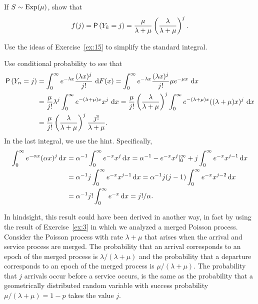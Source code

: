 \begin{exercise}[\faCalculator]
 If $S\sim \operatorname{Exp}(\mu)$, show that 
  \begin{equation} \label{eq:41}
f(j) = \P{Y_k = j} = \frac{\mu}{\lambda+\mu}\left(\frac{\lambda}{\lambda+\mu}\right)^j.
  \end{equation}
  \begin{hint}
Use the ideas of Exercise~\ref{ex:15} to simplify the standard integral.
  \end{hint}
  \begin{solution}
Use conditional probability to see that 
\begin{align*}
  \P{Y_n = j} 
&= \int_0^\infty e^{-\lambda x}\frac{(\lambda x)^j}{j!}\, \d F(x) = \int_0^\infty e^{-\lambda x}\frac{(\lambda x)^j}{j!} \mu e^{-\mu x}\, \d x \\
&= \frac{\mu}{j!}\lambda^j \int_0^\infty e^{-(\lambda+\mu) x}x^j\,\d x = \frac{\mu}{j!}\left(\frac{\lambda}{\lambda+\mu}\right)^j \int_0^\infty e^{-(\lambda+\mu) x}((\lambda+\mu)x)^j\,\d x \\
&= \frac{\mu}{j!}\left(\frac{\lambda}{\lambda+\mu}\right)^j \frac{j!}{\lambda+\mu}.
\end{align*}
In the last integral, we use the hint. Specifically, 
\begin{align*}
  \int_0^\infty e^{-\alpha x} (\alpha x)^j \,\text{d}x 
&=  \alpha^{-1} \int_0^\infty e^{- x} x^j \,\text{d}x  
=  \alpha^{-1} -e^{-x}x^j |_0^\infty + j \int_0^\infty e^{- x} x^{j-1} \,\text{d}x \\
&= \alpha^{-1} j \int_0^\infty e^{- x} x^{j-1} \,\text{d}x 
= \alpha^{-1} j(j-1) \int_0^\infty e^{- x} x^{j-2} \,\text{d}x \\
&= \alpha^{-1} j! \int_0^\infty e^{- x} \,\text{d}x 
= j!/\alpha.
\end{align*}


In hindsight, this result could have been derived in another way, in
fact by using the result of Exercise~\ref{ex:3} in which we analyzed a
merged Poisson process. Consider the Poisson process with rate
$\lambda+\mu$ that arises when the arrival and service process are
merged. The probability that an arrival corresponds to an epoch of the
merged process is $\lambda/(\lambda+\mu)$ and the probability that a
departure corresponds to an epoch of the merged process is
$\mu/(\lambda+\mu)$.  The probability that $j$ arrivals occur before a
service occurs, is the same as the probability that a geometrically
distributed random variable with success probability
$\mu/(\lambda+\mu) = 1-p$ takes the value $j$.
  \end{solution}
\end{exercise}

